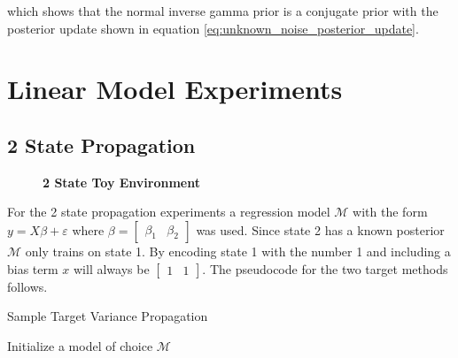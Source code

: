 {{which shows that the normal inverse gamma prior is a conjugate prior with the posterior update shown in equation \ref{eq:unknown_noise_posterior_update}.

\chapter{Linear Model Experiments}

\vspace{-1cm}

\section{2 State Propagation}\label{a:2_state_exp}

\begin{figure}[H]
    \centering
    \caption{\textbf{2 State Toy Environment}}
    \label{fig:app_2state}
\end{figure}

For the 2 state propagation experiments a regression model $\mathcal{M}$ with the form $y = X\beta + \varepsilon$ where $\beta = [\begin{array}{cc}\beta_1  & \beta_2\end{array}]$ was used. Since state 2 has a known posterior $\mathcal{M}$ only trains on state 1. By encoding state 1 with the number 1 and including a bias term $x$ will always be $[\begin{array}{cc}1  & 1\end{array}]$. The pseudocode for the two target methods follows. 

\begin{algorithm}[H]
    \caption{Sample Target Variance Propagation}
    Initialize a model of choice $\mathcal{M}$\\
\end{algorithm}

}}
